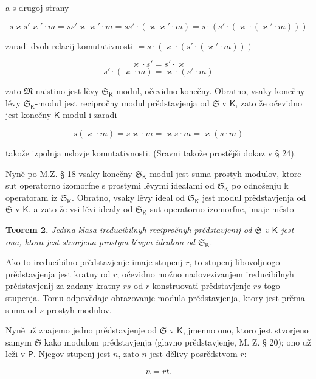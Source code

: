\documentclass[11pt]{article}
\begin{document}
a s drugoj strany

\[
s\varkappa  s'\varkappa '\cdot m=ss'\varkappa \varkappa '\cdot m=ss'\cdot(\varkappa \varkappa '\cdot m)
=s\cdot(s'\cdot(\varkappa \cdot(\varkappa '\cdot m)))
\]

zaradi dvoh relacij komutativnosti \(=s\cdot(\varkappa \cdot(s'\cdot(\varkappa '\cdot m)))\)

\[
\varkappa \cdot s'=s'\cdot \varkappa
\]
\[
s'\cdot(\varkappa \cdot m)=\varkappa \cdot(s'\cdot m)
\]

zato \(\mathfrak M\) naistino jest lěvy \(\mathfrak S_{\mathsf K}\)-modul, očevidno konečny. Obratno, vsaky konečny lěvy \(\mathfrak S_{\mathsf K}\)-modul jest recipročny modul prědstavjenja od \(\mathfrak S\) v \(\mathsf K\), zato že očevidno jest konečny \(\mathsf K\)-modul i zaradi

\[
s(\varkappa \cdot m)=s\varkappa \cdot m=\varkappa s\cdot m=\varkappa (s\cdot m)
\]

takože izpolnja uslovje komutativnosti. (Sravni takože prostějši dokaz v § 24).

Nyně po M.Z. § 18 vsaky konečny \(\mathfrak S_{\mathsf K}\)-modul jest suma prostyh modulov, ktore sut operatorno izomorfne s prostymi lěvymi idealami od \(\mathfrak S_{\mathsf K}\) po odnošenju k operatoram iz \(\mathfrak S_{\mathsf K}\). Obratno, vsaky lěvy ideal od \(\mathfrak S_{\mathsf K}\) jest modul prědstavjenja od \(\mathfrak S\) v \(\mathsf K\), a zato že vsi lěvi idealy od \(\mathfrak S_{\mathsf K}\) sut operatorno izomorfne, imaje město

\textbf{Teorem 2.} \emph{Jedina klasa ireducibilnyh recipročnyh prědstavjenij od \(\mathfrak S\) v \(\mathsf K\) jest ona, ktora jest stvorjena prostym lěvym idealom od \(\mathfrak S_{\mathsf K}\).}

Ako to ireducibilno prědstavjenje imaje stupenj \(r\), to stupenj libovoljnogo prědstavjenja jest kratny od \(r\); očevidno možno nadovezivanjem ireducibilnyh prědstavjenij za zadany kratny \(rs\) od \(r\) konstruovati prědstavjenje \(rs\)-togo stupenja. Tomu odpovědaje obrazovanje modula prědstavjenja, ktory jest prěma suma od \(s\) prostyh modulov.

Nyně už znajemo jedno prědstavjenje od \(\mathfrak S\) v \(\mathsf K\), jmenno ono, ktoro jest stvorjeno samym \(\mathfrak S\) kako modulom prědstavjenja (glavno prědstavjenje, M. Z. § 20); ono už leži v \(\mathsf P\). Njegov stupenj jest \(n\), zato \(n\) jest dělivy posrědstvom \(r\):

\[
n=rt.
\]
\end{document}
